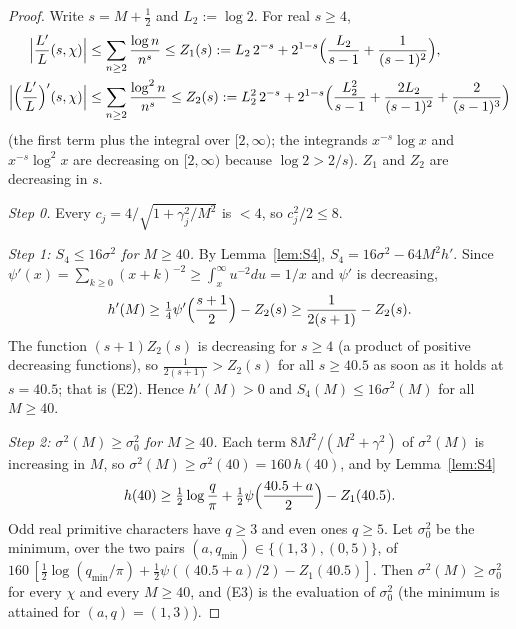\documentclass[11pt]{amsart}
\theoremstyle{definition}
\numberwithin{equation}{section}
\begin{document}
\begin{proof}
Write $s=M+\tfrac12$ and $L_2:=\log2$. For real $s\ge4$,
\begin{align*}
\Bigl|\frac{L'}{L}(s,\chi)\Bigr|&\le\sum_{n\ge2}\frac{\log n}{n^{s}}
\le Z_1(s):=L_2\,2^{-s}+2^{1-s}\Bigl(\frac{L_2}{s-1}+\frac1{(s-1)^2}\Bigr),\\
\Bigl|\Bigl(\frac{L'}{L}\Bigr)'(s,\chi)\Bigr|&\le\sum_{n\ge2}\frac{\log^2n}{n^{s}}
\le Z_2(s):=L_2^2\,2^{-s}+2^{1-s}\Bigl(\frac{L_2^2}{s-1}+\frac{2L_2}{(s-1)^2}
+\frac{2}{(s-1)^3}\Bigr)
\end{align*}
(the first term plus the integral over $[2,\infty)$; the integrands
$x^{-s}\log x$ and $x^{-s}\log^2x$ are decreasing on $[2,\infty)$
because $\log2>2/s$). $Z_1$ and $Z_2$ are decreasing in $s$.

\emph{Step 0.} Every $c_j=4/\sqrt{1+\gamma_j^2/M^2}$ is $<4$, so
$c_j^2/2\le8$.

\emph{Step 1: $S_4\le16\sigma^2$ for $M\ge40$.} By
Lemma~\ref{lem:S4}, $S_4=16\sigma^2-64M^2h'$. Since
$\psi'(x)=\sum_{k\ge0}(x+k)^{-2}\ge\int_x^\infty u^{-2}du=1/x$ and
$\psi'$ is decreasing,
\[
h'(M)\ge\tfrac14\psi'\Bigl(\frac{s+1}{2}\Bigr)-Z_2(s)
\ge\frac{1}{2(s+1)}-Z_2(s).
\]
The function $(s+1)Z_2(s)$ is decreasing for $s\ge4$ (a product of
positive decreasing functions), so $\frac1{2(s+1)}>Z_2(s)$ for all
$s\ge40.5$ as soon as it holds at $s=40.5$; that is (E2). Hence
$h'(M)>0$ and $S_4(M)\le16\sigma^2(M)$ for all $M\ge40$.

\emph{Step 2: $\sigma^2(M)\ge\sigma_0^2$ for $M\ge40$.} Each term
$8M^2/(M^2+\gamma^2)$ of $\sigma^2(M)$ is increasing in $M$, so
$\sigma^2(M)\ge\sigma^2(40)=160\,h(40)$, and by Lemma~\ref{lem:S4}
\[
h(40)\ge\tfrac12\log\frac q\pi+\tfrac12\psi\Bigl(\frac{40.5+a}{2}\Bigr)-Z_1(40.5).
\]
Odd real primitive characters have $q\ge3$ and even ones $q\ge5$.
Let $\sigma_0^2$ be the minimum, over the two pairs
$(a,q_{\min})\in\{(1,3),(0,5)\}$, of
$160\,[\tfrac12\log(q_{\min}/\pi)+\tfrac12\psi((40.5+a)/2)-Z_1(40.5)]$.
Then $\sigma^2(M)\ge\sigma_0^2$ for every $\chi$ and every $M\ge40$,
and (E3) is the evaluation of $\sigma_0^2$ (the minimum is attained
for $(a,q)=(1,3)$).


\end{proof}
\end{document}
